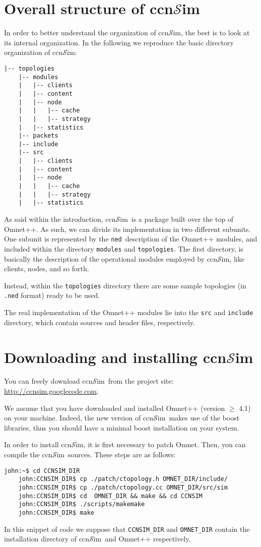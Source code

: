 \documentclass{book}
\newcommand{\ccnsim}{ccn$\mathcal{S}$im}
\newcommand{\ned}{\texttt{ned}}
\begin{document}
\section{Overall structure of \ccnsim}
In order to better understand the organization of \ccnsim, the best is to look at its internal organization. In the following we reproduce the basic directory organization of \ccnsim:
\begin{program}
    \begin{Verbatim}[frame=single]
    |-- topologies
    |-- modules
    |   |-- clients
    |   |-- content
    |   |-- node
    |   |   |-- cache
    |   |   |-- strategy
    |   |-- statistics
    |-- packets
    |-- include
    |-- src
    |   |-- clients
    |   |-- content
    |   |-- node
    |   |   |-- cache
    |   |   |-- strategy
    |   |-- statistics
    \end{Verbatim}
\end{program}
As said within the introduction, \ccnsim\ is a package built over the top of Omnet++. As such, we can divide its implementation in two different subunits. One subunit is represented by the \ned\ description of the Omnet++ modules, and included within the directory \verb|modules| and \verb|topologies|. The first directory, is basically the description of the operational modules employed by \ccnsim, like clients, nodes, and so forth. 

Instead, within the \verb|topologies| directory there are some sample topologies (in \verb|.ned| format) ready to be used. 

The real implementation of the Omnet++ modules lie into the \verb|src| and \verb|include| directory, which contain sources and header files, respectively.  
\section{Downloading and installing \ccnsim}
You can freely download \ccnsim\ from the project site: \url{http://ccnsim.googlecode.com}. 

We assume that you have downloaded and installed Omnet++ (version $\geq$ 4.1) on your machine. Indeed, the new version of \ccnsim\ makes use of the boost libraries, thus you should have a minimal boost installation on your system. 

In order to install \ccnsim, it is first necessary to patch Omnet. Then, you can compile the \ccnsim\ sources. These steps are as follows:

\begin{Verbatim}[frame=single]
    john:~$ cd CCNSIM_DIR
    john:CCNSIM_DIR$ cp ./patch/ctopology.h OMNET_DIR/include/
    john:CCNSIM_DIR$ cp ./patch/ctopology.cc OMNET_DIR/src/sim
    john:CCNSIM_DIR$ cd  OMNET_DIR && make && cd CCNSIM
    john:CCNSIM_DIR$ ./scripts/makemake
    john:CCNSIM_DIR$ make
\end{Verbatim}
In this snippet of code we suppose that \verb|CCNSIM_DIR| and \verb|OMNET_DIR| contain the installation directory of \ccnsim\ and Omnet++ respectively. 
\end{document}
